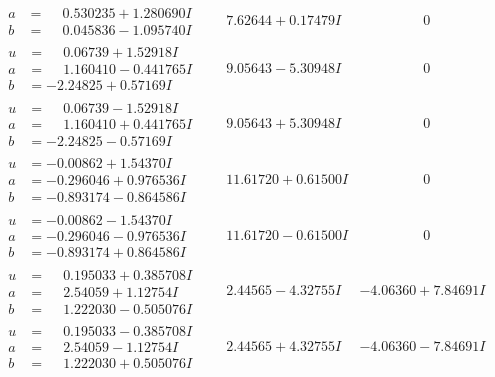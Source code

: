 \documentclass[1p]{elsarticle_modified}
\theoremstyle{definition}
\begin{document}
$$\begin{array}{c|c|c}
\begin{aligned}
a &= \phantom{-}0.530235 + 1.280690 I \\
b &= \phantom{-}0.045836 - 1.095740 I\end{aligned}
 & \phantom{-}7.62644 + 0.17479 I & \phantom{-0.000000 } 0 \\ \hline\begin{aligned}
u &= \phantom{-}0.06739 + 1.52918 I \\
a &= \phantom{-}1.160410 - 0.441765 I \\
b &= -2.24825 + 0.57169 I\end{aligned}
 & \phantom{-}9.05643 - 5.30948 I & \phantom{-0.000000 } 0 \\ \hline\begin{aligned}
u &= \phantom{-}0.06739 - 1.52918 I \\
a &= \phantom{-}1.160410 + 0.441765 I \\
b &= -2.24825 - 0.57169 I\end{aligned}
 & \phantom{-}9.05643 + 5.30948 I & \phantom{-0.000000 } 0 \\ \hline\begin{aligned}
u &= -0.00862 + 1.54370 I \\
a &= -0.296046 + 0.976536 I \\
b &= -0.893174 - 0.864586 I\end{aligned}
 & \phantom{-}11.61720 + 0.61500 I & \phantom{-0.000000 } 0 \\ \hline\begin{aligned}
u &= -0.00862 - 1.54370 I \\
a &= -0.296046 - 0.976536 I \\
b &= -0.893174 + 0.864586 I\end{aligned}
 & \phantom{-}11.61720 - 0.61500 I & \phantom{-0.000000 } 0 \\ \hline\begin{aligned}
u &= \phantom{-}0.195033 + 0.385708 I \\
a &= \phantom{-}2.54059 + 1.12754 I \\
b &= \phantom{-}1.222030 - 0.505076 I\end{aligned}
 & \phantom{-}2.44565 - 4.32755 I & -4.06360 + 7.84691 I \\ \hline\begin{aligned}
u &= \phantom{-}0.195033 - 0.385708 I \\
a &= \phantom{-}2.54059 - 1.12754 I \\
b &= \phantom{-}1.222030 + 0.505076 I\end{aligned}
 & \phantom{-}2.44565 + 4.32755 I & -4.06360 - 7.84691 I \\ \hline\begin{aligned}

\end{aligned}
\end{array}$$
\end{document}
